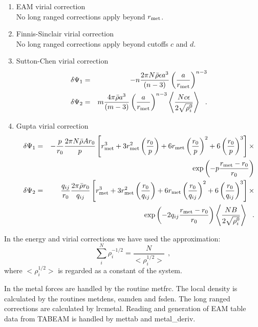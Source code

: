 \begin{enumerate}
\item EAM virial correction \\
No long ranged corrections apply beyond $r_{\rm met}$.
\item Finnis-Sinclair virial correction \\
No long ranged corrections apply beyond cutoffs $c$ and $d$.
\item Sutton-Chen virial correction
\begin{eqnarray}
\delta \Psi_{1} &=& -n \frac{2 \pi N \bar{\rho} \epsilon a^{3}}{(n-3)}
\left( \frac{a}{r_{\rm met}} \right)^{n-3} \nonumber \\
\delta \Psi_{2} &=& m \frac{4 \pi \bar{\rho} a^{3}}{(m-3)} \left( \frac{a}{r_{\rm met}} \right)^{n-3}
\left< \frac{N c \epsilon}{2\sqrt{\rho_{i}^{0}}} \right>~~.
\end{eqnarray}
\item Gupta virial correction
\begin{eqnarray}
\delta \Psi_{1} &=& -\frac{p}{r_{0}} \frac{2 \pi N \bar{\rho} A r_{0}}{p}
\left[ r_{\rm met}^{3} + 3 r_{\rm met}^{2} \left(\frac{r_{0}}{p}\right) +
6 r_{\rm met} \left(\frac{r_{0}}{p}\right)^{2} + 6 \left(\frac{r_{0}}{p}\right)^{3} \right] \times \nonumber \\
& & \exp \left( -p \frac{r_{\rm met}-r_{0}}{r_{0}}\right) \nonumber \\
\delta \Psi_{2} &=& \frac{q_{ij}}{r_{0}} \frac{2 \pi \bar{\rho} r_{0}}{q_{ij}}
\left[ r_{\rm met}^{3} + 3 r_{\rm met}^{2} \left(\frac{r_{0}}{q_{ij}}\right) +
6 r_{\rm met} \left(\frac{r_{0}}{q_{ij}}\right)^{2} + 6 \left(\frac{r_{0}}{q_{ij}}\right)^{3} \right] \times \\
& & \exp \left( -2 q_{ij} \frac{r_{\rm met}-r_{0}}{r_{0}}\right)
\left< \frac{N B}{2\sqrt{\rho_{i}^{0}}} \right>~~. \nonumber
\end{eqnarray}
\end{enumerate}

In the energy and virial corrections we have used the approximation:
\begin{equation}
\sum_{i}^{N}\rho_{i}^{-1/2} = \frac{N}{<\rho_{i}^{1/2}>}~~,
\end{equation}
where $<\rho_{i}^{1/2}>$ is regarded as a constant of the system.

In \D{} the metal forces are handled by the routine {\sc metfrc}.  The
local density is calculated by the routines {\sc metdens}, {\sc
eamden} and {\sc fsden}.  The long ranged corrections are calculated
by {\sc lrcmetal}.  Reading and generation of EAM table data from
TABEAM is handled by {\sc mettab} and {\sc metal\_deriv}.

